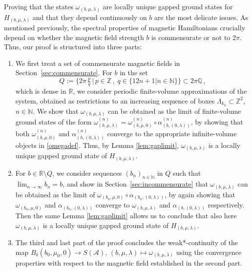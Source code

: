 \documentclass[a4paper]{article}
\newcommand{\w}{\omega}
\newcommand{\N}{\mathbb{N}}
\newcommand{\Z}{\mathbb{Z}}
\newcommand{\Q}{\mathbb{Q}}
\newcommand{\mA}{\mathcal{A}}
\newcommand{\R}{\mathbb{R}}
\theoremstyle{plain}
\theoremstyle{definition}
\theoremstyle{remark}
\renewcommand{\(}{\left(}
\renewcommand{\)}{\right)}
\begin{document}
Proving that the states $ \w_{(b,\mu,\lambda)}$ are locally unique gapped ground states for $H_{(b,\mu,\lambda)}$ and that they depend continuously on $b$ are the most delicate issues. As mentioned previously, the spectral properties of magnetic Hamiltonians crucially depend on whether the magnetic field strength $b$ is commensurate or not to $2\pi$. Thus, our proof is structured into three parts:
\begin{enumerate}
\item We first treat a  set of commensurate magnetic fields in Section~\ref{sec:commensurate}. For $b$ in the set 
\[ Q:=\{2\pi\,\tfrac{p}{q}\,|\, p\in \Z\,,\; q\in\{12n+1|n\in\N\}\} \subset 2\pi\Q\,, \]
which is dense in $\mathbb{R}$, we consider periodic finite-volume approximations of the system, obtained as restrictions to an increasing sequence of  boxes $\Lambda_{k_n} \subset \Z^2$, $n \in \N$. We show that $\w_{(b,\mu,\lambda)}$ can be obtained as the limit of finite-volume ground states of the form $\w_{(b,\mu,\lambda)}^{(n)}  = \w_{(b,\mu,0)}^{(n)} \circ \alpha_{(b,(0, \lambda))}^{(n)}$, by showing that both $\w_{(b,\mu,0)}^{(n)}$ and $\alpha_{(b,(0, \lambda))}^{(n)}$ converge to the appropriate infinite-volume objects in \eqref{omegadef}. Thus, by Lemma \ref{lem:gaplimit}, $\w_{(b,\mu,\lambda)}$ is a locally unique gapped ground state of $H_{(b,\mu,\lambda)}$.
\item For $b\in \R\setminus Q$, we consider sequences $(b_n)_{n\in\N}$ in $Q$ such that $\lim_{n\to\infty} b_n = b$, and show in Section~\ref{sec:incommensurate} that $\w_{(b,\mu,\lambda)}$ can be obtained as the limit of $\w_{(b_n,\mu,0)} \circ \alpha_{(b_n,(0, \lambda))}$, by again showing that $\w_{(b_n,\mu,0)}$ and $\alpha_{(b_n,(0, \lambda))}$ converge to $\w_{(b,\mu,\lambda)}$ and $\alpha_{(b,(0, \lambda))}$ respectively. Then the same Lemma \ref{lem:gaplimit} allows us to conclude that also here $\w_{(b,\mu,\lambda)}$ is a locally unique gapped ground state of $H_{(b,\mu,\lambda)}$.
\item The third and last part of the proof concludes the weak*-continuity of the map $B_{\delta}(b_0,\mu_0,0) \to S(\mA) , \, (b,\mu,\lambda)\mapsto \w_{(b,\mu,\lambda)}$ using the convergence properties with respect to the magnetic field established in the second part.
\end{enumerate} 

 
\end{document}
